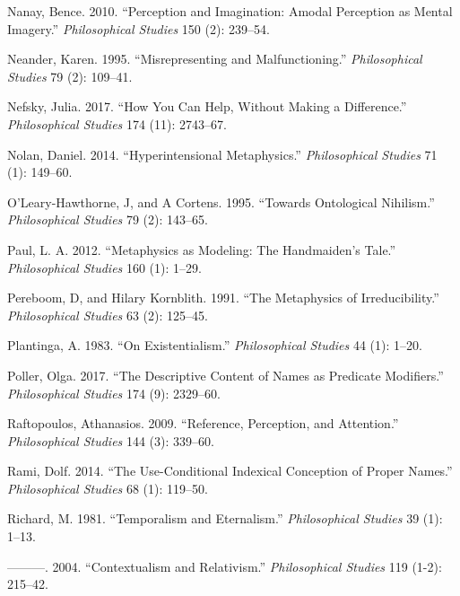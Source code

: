 \documentclass[
  10pt,
  letterpaper,
  DIV=11,
  numbers=noendperiod,
  twoside]{scrartcl}
\newlength{\cslhangindent}
\newenvironment{CSLReferences}[2] %
 {\begin{list}{}{%
  \setlength{\itemindent}{0pt}
  \setlength{\leftmargin}{0pt}
  \setlength{\parsep}{0pt}
  \ifodd #1
   \setlength{\leftmargin}{\cslhangindent}
   \setlength{\itemindent}{-1\cslhangindent}
  \fi
  \setlength{\itemsep}{#2\baselineskip}}}
 {\end{list}}
\begin{document}
\begin{CSLReferences}{1}{0}
Nanay, Bence. 2010. {``Perception and Imagination: Amodal Perception as
Mental Imagery.''} \emph{Philosophical Studies} 150 (2): 239--54.

Neander, Karen. 1995. {``Misrepresenting and Malfunctioning.''}
\emph{Philosophical Studies} 79 (2): 109--41.

Nefsky, Julia. 2017. {``How You Can Help, Without Making a
Difference.''} \emph{Philosophical Studies} 174 (11): 2743--67.

Nolan, Daniel. 2014. {``Hyperintensional Metaphysics.''}
\emph{Philosophical Studies} 71 (1): 149--60.

O'Leary-Hawthorne, J, and A Cortens. 1995. {``Towards Ontological
Nihilism.''} \emph{Philosophical Studies} 79 (2): 143--65.

Paul, L. A. 2012. {``Metaphysics as Modeling: The Handmaiden's Tale.''}
\emph{Philosophical Studies} 160 (1): 1--29.

Pereboom, D, and Hilary Kornblith. 1991. {``The Metaphysics of
Irreducibility.''} \emph{Philosophical Studies} 63 (2): 125--45.

Plantinga, A. 1983. {``On Existentialism.''} \emph{Philosophical
Studies} 44 (1): 1--20.

Poller, Olga. 2017. {``The Descriptive Content of Names as Predicate
Modifiers.''} \emph{Philosophical Studies} 174 (9): 2329--60.

Raftopoulos, Athanasios. 2009. {``Reference, Perception, and
Attention.''} \emph{Philosophical Studies} 144 (3): 339--60.

Rami, Dolf. 2014. {``The Use-Conditional Indexical Conception of Proper
Names.''} \emph{Philosophical Studies} 68 (1): 119--50.

Richard, M. 1981. {``Temporalism and Eternalism.''} \emph{Philosophical
Studies} 39 (1): 1--13.

---------. 2004. {``Contextualism and Relativism.''} \emph{Philosophical
Studies} 119 (1-2): 215--42.


\end{CSLReferences}
\end{document}
